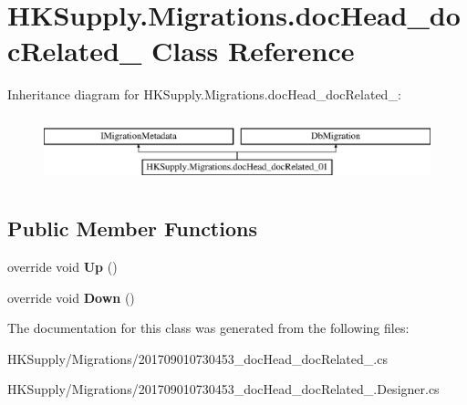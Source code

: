 \hypertarget{class_h_k_supply_1_1_migrations_1_1doc_head__doc_related__01}{}\section{H\+K\+Supply.\+Migrations.\+doc\+Head\+\_\+doc\+Related\+\_ Class Reference}
\label{class_h_k_supply_1_1_migrations_1_1doc_head__doc_related__01}
Inheritance diagram for H\+K\+Supply.\+Migrations.\+doc\+Head\+\_\+doc\+Related\+\_\+:\begin{figure}[H]
\begin{center}
\leavevmode
\includegraphics[height=1.964912cm]{class_h_k_supply_1_1_migrations_1_1doc_head__doc_related__01}
\end{center}
\end{figure}
\subsection*{Public Member Functions}
\begin{DoxyCompactItemize}
\item 
\mbox{\label{class_h_k_supply_1_1_migrations_1_1doc_head__doc_related__01_aa791d22a25c0c0b8af605ffa44beb8b9}} 
override void {\bfseries Up} ()
\item 
\mbox{\label{class_h_k_supply_1_1_migrations_1_1doc_head__doc_related__01_a92e1f8f7a4cba6877959acfa47323182}} 
override void {\bfseries Down} ()
\end{DoxyCompactItemize}


The documentation for this class was generated from the following files\+:\begin{DoxyCompactItemize}
\item 
H\+K\+Supply/\+Migrations/201709010730453\+\_\+doc\+Head\+\_\+doc\+Related\+\_.\+cs\item 
H\+K\+Supply/\+Migrations/201709010730453\+\_\+doc\+Head\+\_\+doc\+Related\+\_.\+Designer.\+cs\end{DoxyCompactItemize}
